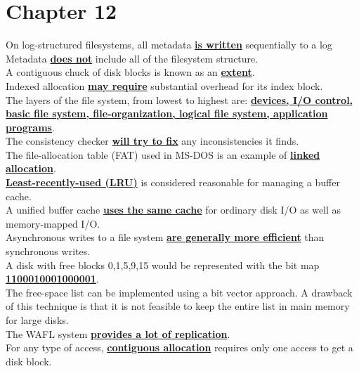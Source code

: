 \documentclass[10pt]{article}
\newcommand{\qw}[1]{\textbf{\ul{#1}}}
\begin{document}
\section*{\centering Chapter 12}
On log-structured filesystems, all metadata \qw{is written} sequentially to a log\\[2mm]
Metadata \qw{does not} include all of the filesystem structure.\\[2mm]
A contiguous chuck of disk blocks is known as an \qw{extent}.\\[2mm]
Indexed allocation \qw{may require} substantial overhead for its index block.\\[2mm]
The layers of the file system, from lowest to highest are: \qw{devices, I/O control, basic file system, file-organization, logical file system, application programs}.\\[2mm]
The consistency checker \qw{will try to fix} any inconsistencies it finds.\\[2mm]
The file-allocation table (FAT) used in MS-DOS is an example of \qw{linked allocation}.\\[2mm]
\qw{Least-recently-used (LRU)} is considered reasonable for managing a buffer cache.\\[2mm]
A unified buffer cache \qw{uses the same cache} for ordinary disk I/O as well as memory-mapped I/O.\\[2mm]
Asynchronous writes to a file system \qw{are generally more efficient} than synchronous writes.\\[2mm]
A disk with free blocks 0,1,5,9,15 would be represented with the bit map \qw{1100010001000001}.\\[2mm]
The free-space list can be implemented using a bit vector approach.
A drawback of this technique is that it is not feasible to keep the entire list
in main memory for large disks.\\[2mm]
The WAFL system \qw{provides a lot of replication}.\\[2mm]
For any type of access, \qw{contiguous allocation} requires only one access to get a disk block.
\newpage
\end{document}
